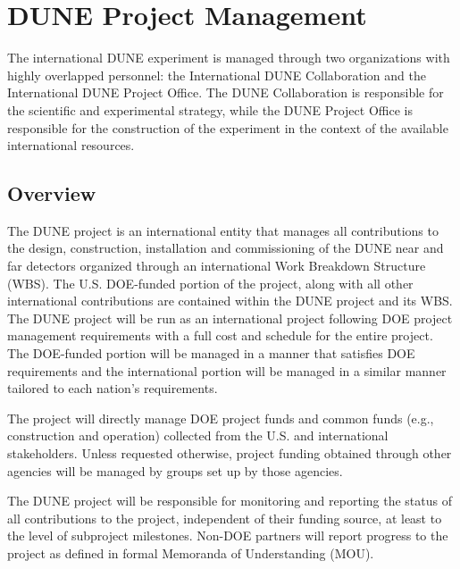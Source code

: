 \chapter{DUNE Project Management}
\label{ch:detectors-pm}

The international DUNE experiment is managed through two organizations
with highly overlapped personnel: the International DUNE Collaboration
and the International DUNE Project Office. The DUNE Collaboration is
responsible for the scientific and experimental strategy, while the
DUNE Project Office is responsible for the construction of the
experiment in the context of the available international resources.


\section{Overview}

The DUNE project is an international entity that manages
all contributions to the design, construction, installation and
commissioning of the DUNE near and far detectors organized through an
international Work Breakdown Structure (WBS). The U.S. DOE-funded
portion of the project, along with all other international
contributions are contained within the DUNE project and its WBS. The DUNE project
will be run as an international project following DOE project management
requirements with a full cost and schedule for
the entire project.  The DOE-funded portion will be managed in a
manner that satisfies DOE requirements and the international
portion will be managed in a similar manner tailored to each
nation's requirements.

The project will directly manage DOE project funds and 
common funds (e.g., construction and operation) collected from the
U.S. and international stakeholders. Unless requested otherwise,
project funding obtained through other agencies will be managed
by groups set up by those agencies.

The DUNE project will be responsible for monitoring and reporting 
the status of all contributions to the project, independent of their
funding source, at least to the level of subproject milestones.
Non-DOE partners will report progress to the project as defined in
formal Memoranda of Understanding (MOU).


